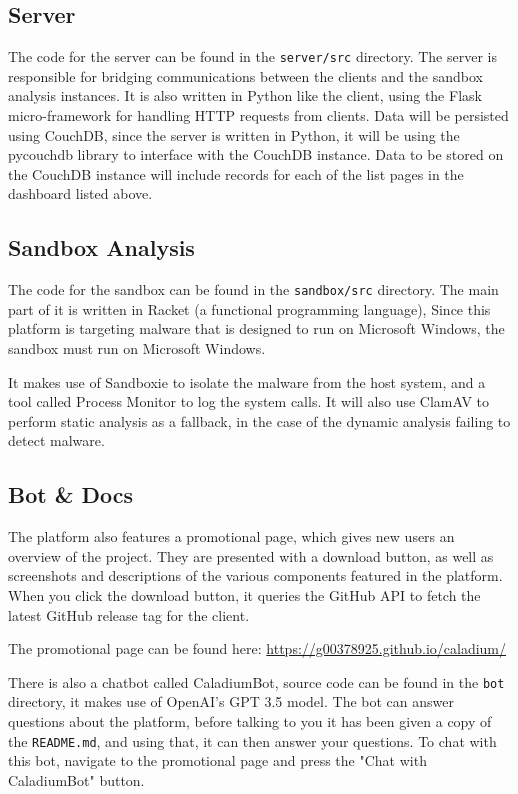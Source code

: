 \subsection{Server}
The code for the server can be found in the \texttt{server/src} directory.
The server is responsible for bridging communications between
the clients and the sandbox analysis instances.
It is also written in Python like the client,
using the Flask micro-framework for handling HTTP requests from clients.
Data will be persisted using CouchDB, since the server is written in Python,
it will be using the pycouchdb library to interface with the CouchDB instance.
Data to be stored on the CouchDB instance will include records for
each of the list pages in the dashboard listed above.

\subsection{Sandbox Analysis}
The code for the sandbox can be found in the \texttt{sandbox/src} directory.
The main part of it is written in Racket (a functional programming language),
Since this platform is targeting malware that is designed to
run on Microsoft Windows, the sandbox must run on Microsoft Windows.

It makes use of Sandboxie to isolate the malware from the host system,
and a tool called Process Monitor to log the system calls.
It will also use ClamAV to perform static analysis as a fallback,
in the case of the dynamic analysis failing to detect malware.

\subsection{Bot \& Docs}
The platform also features a promotional page,
which gives new users an overview of the project.
They are presented with a download button,
as well as screenshots and descriptions of
the various components featured in the platform.
When you click the download button,
it queries the GitHub API to fetch the latest
GitHub release tag for the client.

The promotional page can be found here:
\href{https://g00378925.github.io/caladium/}{https://g00378925.github.io/caladium/}

There is also a chatbot called CaladiumBot, source code can be found in the
\texttt{bot} directory, it makes use of OpenAI's GPT 3.5 model. \cite{openai}
The bot can answer questions about the platform,
before talking to you it has been given a copy of the \texttt{README.md},
and using that, it can then answer your questions.
To chat with this bot, navigate to the promotional page and press the
"Chat with CaladiumBot" button.

